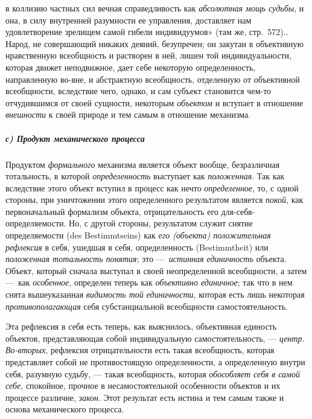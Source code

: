 \documentclass[twoside]{article}
\begin{document}
{{{{{{в коллизию частных сил вечная справедливость как {\em абсолютная мощь
судьбы}, и она, в силу внутренней разумности ее управления, доставляет нам 
удовлетворение зрелищем самой гибели индивидуумов» (там же, стр.~572).}\label{bkm:bm71}.
Народ, не совершающий никаких деяний, безупречен; он закутан
в объективную нравственную всеобщность и растворен в ней, лишен той
индивидуальности, которая движет неподвижное, дает себе некоторую
определенность, направленную во-вне, и абстрактную всеобщность, отделенную
от объективной всеобщности, вследствие чего, однако, и сам субъект
становится чем-то отчудившимся от своей сущности, некоторым
{\em объектом} и вступает
в отношение {\em внешности}
к своей природе и тем самым в отношение механизма.

\subparagraph[с) Продукт механического процесса]{с) Продукт механического процесса}
Продуктом
{\em формального}
механизма является объект вообще, безразличная тотальность, в
которой {\em определенность}
выступает как
{\em положенная}. Так как
вследствие этого объект вступил в процесс как нечто
{\em определенное}, то, с
одной стороны, при уничтожении этого определенного результатом является
{\em покой}, как
первоначальный формализм объекта, отрицательность его
для-себя-определяемости. Но, с другой стороны,
результатом служит
снятие~\label{bkm:bm72}
определяемости (des Bestimmtseins) как
{\em его (объекта) положительная
рефлексия} в себя, ушедшая в себя, определенность
(Bestimmtheit) или {\em положенная
тотальность понятия}; это
—~{\em истинная единичность
}объекта. Объект, который сначала выступал в
своей неопределенной всеобщности, а затем —~как
{\em особенное},
определен теперь как
{\em объективно единичное};
так что в нем снята вышеуказанная
{\em видимость той единичности},
которая есть лишь некоторая
{\em противополагающая}
себя субстанциальной всеобщности самостоятельность.

Эта рефлексия в себя есть теперь, как выяснилось, объективная
единость объектов, представляющая собой индивидуальную самостоятельность,
— {\em центр}.
{\em Во-вторых},
рефлексия отрицательности есть такая всеобщность, которая
представляет собой не противостоящую определенности, а определенную внутри
себя, разумную судьбу, — такая всеобщность, которая
{\em обособляет себя в
}{\em самой себе},
спокойное, прочное в несамостоятельной особенности объектов и
их процессе различие, {\em закон}.
Этот результат есть истина и тем самым также и основа
механического процесса.

}}}}}
\end{document}
